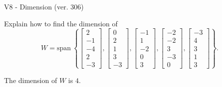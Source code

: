 \begin{exercise}
  \begin{exerciseTitle}V8 - Dimension (ver. 306)\end{exerciseTitle}
  \begin{exerciseStatement}
    Explain how to find the dimension of 
\[W=\mathrm{span}\ \left\{\left[\begin{array}{r}
2 \\
-1 \\
-4 \\
2 \\
-3
\end{array}\right] , \left[\begin{array}{r}
0 \\
2 \\
1 \\
3 \\
-3
\end{array}\right] , \left[\begin{array}{r}
-1 \\
1 \\
-2 \\
0 \\
3
\end{array}\right] , \left[\begin{array}{r}
-2 \\
-2 \\
3 \\
-3 \\
0
\end{array}\right] , \left[\begin{array}{r}
-3 \\
4 \\
3 \\
1 \\
3
\end{array}\right]\right\}.\]



  \end{exerciseStatement}
  \begin{exerciseAnswer}
   The dimension of \(W\) is  \(4\).
  


  \end{exerciseAnswer}
\end{exercise}